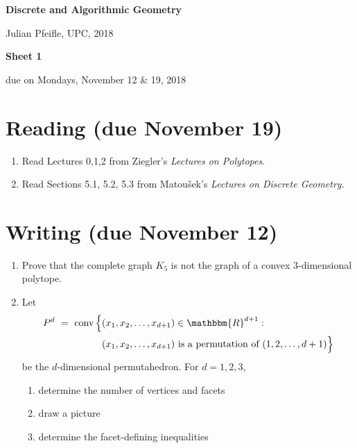 \documentclass[11pt]{amsart}
\DeclareMathOperator{\conv}{conv}
\newcommand{\RR}{\mathbbm{R}}
\begin{document}
\begin{center}
\textbf{\sffamily
   Discrete and Algorithmic Geometry }

\medskip
   Julian Pfeifle,
   UPC, 2018
\end{center}

\bigskip

\begin{center}
  \textbf{\sffamily Sheet 1}

\bigskip
 due on Mondays, November 12 \& 19, 2018

\end{center}

\bigskip
\bigskip
\bigskip

\section*{Reading (due November 19)}

\begin{enumerate}
\setlength{\itemsep}{2ex}
\item Read Lectures 0,1,2 from Ziegler's \emph{Lectures on Polytopes}.

\item Read Sections 5.1, 5.2, 5.3 from Matou\v sek's \emph{Lectures on
    Discrete Geometry}.

\end{enumerate}

\bigskip
\bigskip
\section*{Writing (due November 12)}
\begin{enumerate}
\item Prove that the complete graph $K_5$ is not the graph of a convex $3$-dimensional polytope.

  \bigskip\bigskip
\item Let
  \[
    \begin{aligned}
    P^d
    \ = \
    \conv\Big\{&(x_1,x_2,\dots,x_{d+1})\in \RR^{d+1} :
    \\
    &(x_1,x_2,\dots,x_{d+1}) \text{ is a permutation of } (1,2,\dots,d+1)\Big\}
  \end{aligned}
\]
  be the $d$-dimensional permutahedron.
  For $d=1,2,3$,
  \begin{enumerate}
  \item determine the number of vertices and facets
  \item draw a picture
  \item determine the facet-defining inequalities
  \end{enumerate}
\end{enumerate}
\end{document}
